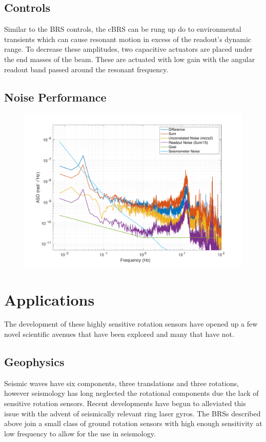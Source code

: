 \documentclass [12pt, proquest]{uwthesis}[2019]
\begin{document}
\section{Controls}

Similar to the BRS controls, the cBRS can be rung up do to environmental transients which can cause resonant motion in excess of the readout's dynamic range. To decrease these amplitudes, two capacitive actuators are placed under the end masses of the beam. These are actuated with low gain with the angular readout band passed around the resonant frequency. 

\section{Noise Performance}

\begin{figure}%
\begin{center}
 \includegraphics[width=\textwidth]{cBRS_Noise_11_19_19.pdf}
\caption{}
\label{cBRS_noise}
\end{center}
\end{figure}

\chapter{Applications}
\quad The development of these highly sensitive rotation sensors have opened up a few novel scientific avenues that have been explored and many that have not.

\section{Geophysics}
Seismic waves have six components, three translations and three rotations, however seismology has long neglected the rotational components due the lack of sensitive rotation sensors. Recent developments have begun to alleviated this issue with the advent of seismically relevant ring laser gyros. \cite{ring} The BRSs described above join a small class of ground rotation sensors with high enough sensitivity at low frequency to allow for the use in seismology.
\end{document}
